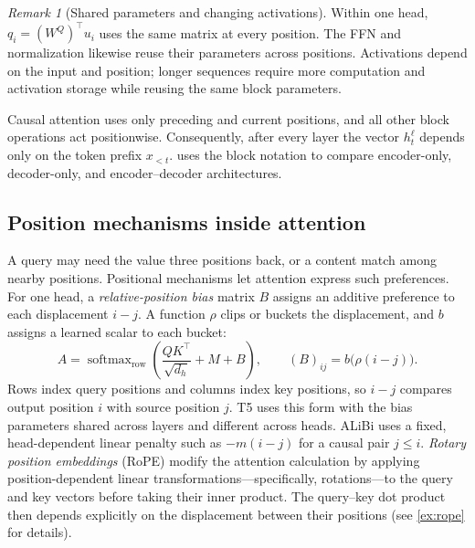 \documentclass[11pt,twoside]{article}
\DeclareMathOperator{\softmax}{softmax}
\theoremstyle{plain}
\theoremstyle{definition}
\theoremstyle{remark}
\newtheorem{remark}{Remark}[section]
\begin{document}
\begin{remark}[Shared parameters and changing activations]
\label{rem:parameter-reuse}
Within one head, $q_i=(W^Q)^\top u_i$ uses the same matrix at every
position. The FFN and normalization likewise reuse their parameters across
positions. Activations depend on the input and position; longer
sequences require more computation and activation storage while reusing the
same block parameters.
\end{remark}

Causal attention uses only preceding and current positions, and all other
block operations act positionwise. Consequently, after every layer the
vector $h_t^\ell$ depends only on the token prefix $x_{<t}$.
 uses the block notation to compare
encoder-only, decoder-only, and encoder--decoder architectures.

\subsection{Position mechanisms inside attention}
\label{sec:attention-position}
\label{rem:attention-position}

A query may need the value three positions back, or a content match among
nearby positions. Positional mechanisms let attention express such preferences.
For one head, a \emph{relative-position bias} matrix $B$ assigns an additive
preference to each displacement $i-j$. A function $\rho$ clips or buckets
the displacement, and $b$ assigns a learned scalar to each bucket:
\begin{equation}
A=\softmax_{\mathrm{row}}\!\left(
\frac{QK^\top}{\sqrt{d_h}}+M+B
\right),
\qquad
(B)_{ij}=b\bigl(\rho(i-j)\bigr).
\label{eq:relative-position-bias}
\end{equation}
Rows index query
positions and columns index key positions, so $i-j$ compares output position
$i$ with source position $j$. T5 uses this form with the bias parameters
shared across layers and different across heads. ALiBi uses a fixed,
head-dependent linear penalty such as $-m(i-j)$ for a causal pair $j\leq i$.
\emph{Rotary position embeddings} (RoPE) modify the attention calculation by applying position-dependent linear
transformations---specifically, rotations---to the query and key vectors before
taking their inner product.
The query--key dot product then depends explicitly on
the displacement between their positions (see
\cref{ex:rope} for details).
\end{document}
